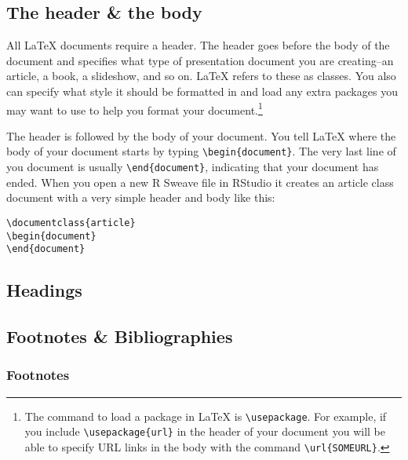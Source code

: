 \subsection{The header \& the body}

All LaTeX documents require a header. The header goes before the body of the document and specifies what type of presentation document you are creating--an article, a book, a slideshow, and so on. LaTeX refers to these as classes. You also can specify what style it should be formatted in and load any extra packages you may want to use to help you format your document.\footnote{The command to load a package in LaTeX is \texttt{\textbackslash{}usepackage}. For example, if you include \texttt{\textbackslash{}usepackage\{url\}} in the header of your document you will be able to specify URL links in the body with the command \texttt{\textbackslash{}url\{SOMEURL\}}.}

The header is followed by the body of your document. You tell LaTeX where the body of your document starts by typing \texttt{\textbackslash{}begin\{document\}}. The very last line of you document is usually \texttt{\textbackslash{}end\{document\}}, indicating that your document has ended. When you open a new R Sweave file in RStudio it creates an article class document with a very simple header and body like this:

\begin{knitrout}
\color{fgcolor}\begin{kframe}
\begin{alltt}
\textbackslash{}documentclass\{article\}
\textbackslash{}begin\{document\}
\textbackslash{}end\{document\}
\end{alltt}
\end{kframe}
\end{knitrout}



\subsection{Headings}

\subsection{Footnotes \& Bibliographies}

\subsubsection{Footnotes}

